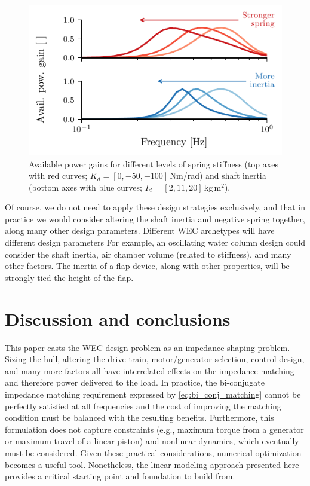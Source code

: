 \documentclass[lettersize,journal]{IEEEtran}
\begin{document}
\begin{figure}[tb]
        \centering
        \includegraphics[width=1\columnwidth]{wec_as_multiport_spring_inertia_transducer_gains.pdf}
        \caption{Available power gains for different levels of spring stiffness (top axes with red curves; $K_d=[0, -50, -100]$\,Nm/rad) and shaft inertia (bottom axes with blue curves; $I_d=[2, 11, 20]$\,kg\,m$^2$).}
        \label{fig:wec_as_multiport_spring_inertia_transducer_gains}
\end{figure}

Of course, we do not need to apply these design strategies exclusively, and that in practice we would consider altering the shaft inertia and negative spring together, along many other design parameters.
Different WEC archetypes will have different design parameters
For example, an oscillating water column design could consider the shaft inertia, air chamber volume (related to stiffness), and many other factors.
The inertia of a flap device, along with other properties, will be strongly tied the height of the flap.

\section{Discussion and conclusions}
This paper casts the WEC design problem as an impedance shaping problem.
Sizing the hull, altering the drive-train, motor/generator selection, control design, and many more factors all have interrelated effects on the impedance matching and therefore power delivered to the load.
In practice, the bi-conjugate impedance matching requirement expressed by \eqref{eq:bi_conj_matching} cannot be perfectly satisfied at all frequencies and the cost of improving the matching condition must be balanced with the resulting benefits.
Furthermore, this formulation does not capture constraints (e.g., maximum torque from a generator or maximum travel of a linear piston) and nonlinear dynamics, which eventually must be considered.
Given these practical considerations, numerical optimization becomes a useful tool.
Nonetheless, the linear modeling approach presented here provides a critical starting point and foundation to build from.
\end{document}
